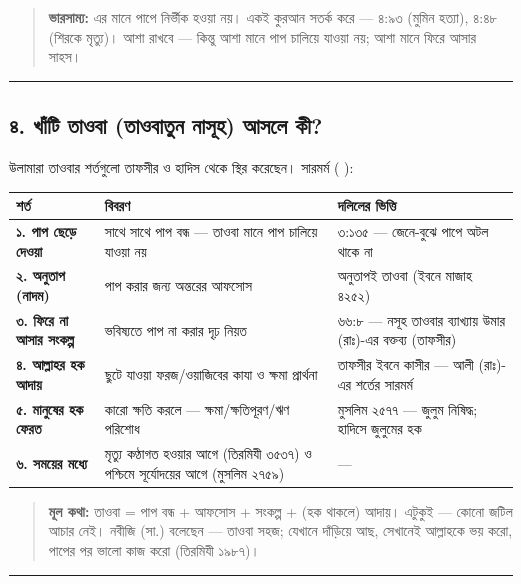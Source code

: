 \begin{quote}
 \textbf{ভারসাম্য:} এর মানে পাপে নির্ভীক হওয়া নয়। একই কুরআন সতর্ক করে — ৪:৯৩ (মুমিন হত্যা), ৪:৪৮ (শিরকে মৃত্যু)। আশা রাখবে — কিন্তু আশা মানে পাপ চালিয়ে যাওয়া নয়; আশা মানে ফিরে আসার সাহস।
\end{quote}

\medskip\hrule\medskip

\subsection*{৪. খাঁটি তাওবা (তাওবাতুন নাসূহ) আসলে কী?}

উলামারা তাওবার শর্তগুলো তাফসীর ও হাদিস থেকে স্থির করেছেন। সারমর্ম ( ):

\begin{table}[h]\centering\small
\begin{tabular}{lll}
শর্ত & বিবরণ & দলিলের ভিত্তি \\
\hline
\textbf{১. পাপ ছেড়ে দেওয়া} & সাথে সাথে পাপ বন্ধ — তাওবা মানে পাপ চালিয়ে যাওয়া নয় & ৩:১৩৫ — \lat{“}জেনে-বুঝে পাপে অটল থাকে না\lat{”} \\
\textbf{২. অনুতাপ (নাদম)} & পাপ করার জন্য অন্তরের আফসোস & \lat{“}অনুতাপই তাওবা\lat{”} (ইবনে মাজাহ ৪২৫২) \\
\textbf{৩. ফিরে না আসার সংকল্প} & ভবিষ্যতে পাপ না করার দৃঢ় নিয়ত & ৬৬:৮ — নসূহ তাওবার ব্যাখ্যায় উমার (রাঃ)-এর বক্তব্য (তাফসীর) \\
\textbf{৪. আল্লাহর হক আদায়} & ছুটে যাওয়া ফরজ/ওয়াজিবের কাযা ও ক্ষমা প্রার্থনা & তাফসীর ইবনে কাসীর — আলী (রাঃ)-এর শর্তের সারমর্ম \\
\textbf{৫. মানুষের হক ফেরত} & কারো ক্ষতি করলে — ক্ষমা/ক্ষতিপূরণ/ঋণ পরিশোধ & মুসলিম ২৫৭৭ — জুলুম নিষিদ্ধ; হাদিসে \lat{“}জুলুমের হক\lat{”} \\
\textbf{৬. সময়ের মধ্যে} & মৃত্যু কণ্ঠাগত হওয়ার আগে (তিরমিযী ৩৫৩৭) ও পশ্চিমে সূর্যোদয়ের আগে (মুসলিম ২৭৫৯) & — \\
\hline
\end{tabular}
\end{table}

\begin{quote}
\textbf{মূল কথা:} তাওবা = পাপ বন্ধ + আফসোস + সংকল্প + (হক থাকলে) আদায়। এটুকুই — কোনো জটিল আচার নেই। নবীজি (সা.) বলেছেন — তাওবা সহজ; যেখানে দাঁড়িয়ে আছ, সেখানেই আল্লাহকে ভয় করো, পাপের পর ভালো কাজ করো (তিরমিযী ১৯৮৭)।
\end{quote}

\medskip\hrule\medskip

